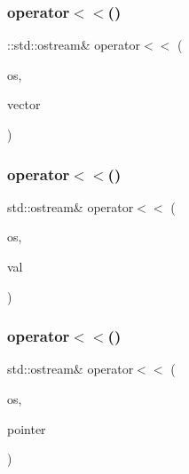 \subsubsection{\texorpdfstring{operator$<$$<$()}{operator<<()}\hspace{0.1cm}{\footnotesize\ttfamily [1/5]}}
{\footnotesize\ttfamily \+::std\+::ostream\& operator$<$$<$ (\begin{DoxyParamCaption}\item[{\+::std\+::ostream \&}]{os,  }\item[{const \mbox{\hyperlink{class_testing_vector}{Testing\+Vector}} \&}]{vector }\end{DoxyParamCaption})}

\mbox{\label{_obj__test_2lib_2googletest-master_2googletest_2test_2gtest__unittest_8cc_ab80209c07a91db303a9d415dc9bd4e81}} 
\subsubsection{\texorpdfstring{operator$<$$<$()}{operator<<()}\hspace{0.1cm}{\footnotesize\ttfamily [2/5]}}
{\footnotesize\ttfamily std\+::ostream\& operator$<$$<$ (\begin{DoxyParamCaption}\item[{std\+::ostream \&}]{os,  }\item[{const \mbox{\hyperlink{class_base}{Base}} \&}]{val }\end{DoxyParamCaption})}

\mbox{\label{_obj__test_2lib_2googletest-master_2googletest_2test_2gtest__unittest_8cc_ac4fc0177334a6fd32b81376c9a2a2dc6}} 
\subsubsection{\texorpdfstring{operator$<$$<$()}{operator<<()}\hspace{0.1cm}{\footnotesize\ttfamily [3/5]}}
{\footnotesize\ttfamily std\+::ostream\& operator$<$$<$ (\begin{DoxyParamCaption}\item[{std\+::ostream \&}]{os,  }\item[{const \mbox{\hyperlink{class_base}{Base}} $\ast$}]{pointer }\end{DoxyParamCaption})}

